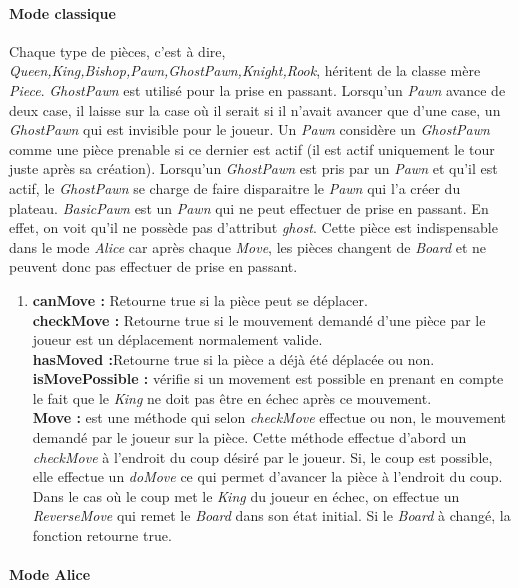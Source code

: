 \documentclass[10pt, a4paper]{article}
\begin{document}
\paragraph{Mode classique}Chaque type de pièces, c'est à dire, \textit{Queen,King,Bishop,Pawn,GhostPawn,Knight,Rook}, héritent de la classe mère \textit{Piece}.
\textit{GhostPawn} est utilisé pour la prise en passant. Lorsqu'un \textit{Pawn} avance de deux case, il laisse sur la case où il serait si il n'avait avancer que d'une case, un \textit{GhostPawn} qui est invisible pour le joueur. Un \textit{Pawn} considère un \textit{GhostPawn} comme une pièce prenable si ce dernier est actif (il est actif uniquement le tour juste après sa création). Lorsqu'un \textit{GhostPawn} est pris par un \textit{Pawn} et qu'il est actif, le \textit{GhostPawn} se charge de faire disparaitre le \textit{Pawn} qui l'a créer du plateau.
\textit{BasicPawn} est un \textit{Pawn} qui ne peut effectuer de prise en passant. En effet, on voit qu'il ne possède pas d'attribut \textit{ghost}. Cette pièce est indispensable dans le mode \textit{Alice} car après chaque \textit{Move}, les pièces changent de \textit{Board} et ne peuvent donc pas effectuer de prise en passant.
\begin{enumerate}
\item
\textbf{canMove :} Retourne true si la pièce peut se déplacer. \\
\textbf{checkMove :} Retourne true si le mouvement demandé d'une pièce par le joueur est un déplacement normalement valide.\\
\textbf{hasMoved :}Retourne true si la pièce a déjà été déplacée ou non.\\
\textbf{isMovePossible :} vérifie si un movement est possible en prenant en compte le fait que le \textit{King} ne doit pas être en échec après ce mouvement.\\
\textbf{Move :} est une méthode qui selon \textit{checkMove} effectue ou non, le mouvement demandé par le joueur sur la pièce. Cette méthode effectue d'abord un \textit{checkMove} à l'endroit du coup désiré par le joueur. Si, le coup est possible, elle effectue un \textit{doMove} ce qui permet d'avancer la pièce à l'endroit du coup. Dans le cas où le coup met le \textit{King} du joueur en échec, on effectue un \textit{ReverseMove} qui remet le \textit{Board} dans son état initial. Si le \textit{Board} à changé, la fonction retourne true.\\
\end{enumerate}

\paragraph{Mode Alice}
\end{document}
